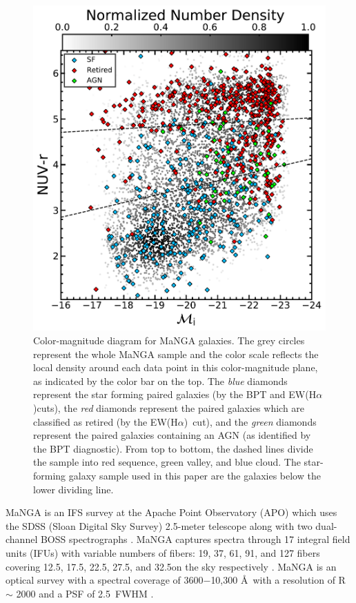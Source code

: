 \documentclass[iop,revtex4,twocolumn,apj,numberedappendix,appendixfloats]{emulateapj}
\newcommand{\ewha}{EW(H$\alpha$)}
\begin{document}
\begin{figure}
\centering
\includegraphics[width=\linewidth]{fig/color-mag.pdf}
\caption[]{Color-magnitude diagram for MaNGA galaxies. The grey circles represent the whole MaNGA sample and the color scale reflects the local density around each data point in this color-magnitude plane, as indicated by the color bar on the top. The {\it blue} diamonds represent the star forming paired galaxies (by the BPT and \ewha cuts), the {\it red} diamonds represent the paired galaxies which are classified as retired (by the \ewha\ cut), and the {\it green} diamonds represent the paired galaxies containing an AGN (as identified by the BPT diagnostic). From top to bottom, the dashed lines divide the sample into red sequence, green valley, and blue cloud. The star-forming galaxy sample used in this paper are the galaxies below the lower dividing line.}
\label{fig:cmd}
\end{figure}

MaNGA is an IFS survey at the Apache Point Observatory (APO) which uses the SDSS (Sloan Digital Sky Survey) 2.5-meter telescope along with two dual-channel BOSS spectrographs \citep{Drory:2015}. MaNGA captures spectra through 17 integral field units (IFUs) with variable numbers of fibers: 19, 37, 61, 91, and 127 fibers covering 12.5\arcsec, 17.5\arcsec, 22.5\arcsec, 27.5\arcsec, and 32.5\arcsec on the sky respectively \citep{Law:2015}. MaNGA is an optical survey with a spectral coverage of 3600$-$10,300 \AA\ with a resolution of R $\sim$ 2000 and a PSF of 2.5\arcsec\ FWHM \citep{Bundy:2015}. 
\end{document}
